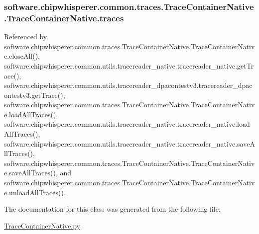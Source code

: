 \subsubsection[{traces}]{\setlength{\rightskip}{0pt plus 5cm}software.\+chipwhisperer.\+common.\+traces.\+Trace\+Container\+Native.\+Trace\+Container\+Native.\+traces}\label{classsoftware_1_1chipwhisperer_1_1common_1_1traces_1_1TraceContainerNative_1_1TraceContainerNative_a616fd2f435d14a2a3cc68b4892aad9eb}


Referenced by software.\+chipwhisperer.\+common.\+traces.\+Trace\+Container\+Native.\+Trace\+Container\+Native.\+close\+All(), software.\+chipwhisperer.\+common.\+utils.\+tracereader\+\_\+native.\+tracereader\+\_\+native.\+get\+Trace(), software.\+chipwhisperer.\+common.\+utils.\+tracereader\+\_\+dpacontestv3.\+tracereader\+\_\+dpacontestv3.\+get\+Trace(), software.\+chipwhisperer.\+common.\+traces.\+Trace\+Container\+Native.\+Trace\+Container\+Native.\+load\+All\+Traces(), software.\+chipwhisperer.\+common.\+utils.\+tracereader\+\_\+native.\+tracereader\+\_\+native.\+load\+All\+Traces(), software.\+chipwhisperer.\+common.\+utils.\+tracereader\+\_\+native.\+tracereader\+\_\+native.\+save\+All\+Traces(), software.\+chipwhisperer.\+common.\+traces.\+Trace\+Container\+Native.\+Trace\+Container\+Native.\+save\+All\+Traces(), and software.\+chipwhisperer.\+common.\+traces.\+Trace\+Container\+Native.\+Trace\+Container\+Native.\+unload\+All\+Traces().



The documentation for this class was generated from the following file\+:\begin{DoxyCompactItemize}
\item 
\hyperlink{TraceContainerNative_8py}{Trace\+Container\+Native.\+py}\end{DoxyCompactItemize}
